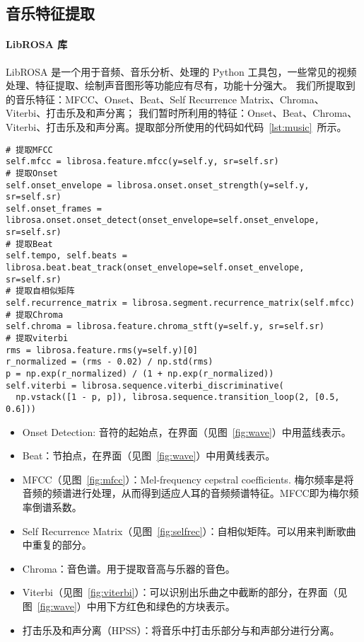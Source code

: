 \documentclass[a4paper,utf8,10pt]{article}
\newcommand{\sept}{\setlength\itemsep{-4pt}}
\begin{document}
\subsection{音乐特征提取}
\paragraph{LibROSA 库} LibROSA 是一个用于音频、音乐分析、处理的 Python 工具包，一些常见的视频处理、特征提取、绘制声音图形等功能应有尽有，功能十分强大。
我们所提取到的音乐特征：MFCC、Onset、Beat、Self Recurrence Matrix、Chroma、Viterbi、打击乐及和声分离；
我们暂时所利用的特征：Onset、Beat、Chroma、Viterbi、打击乐及和声分离。提取部分所使用的代码如代码~\ref{lst:music}~所示。
 \label{lst:music}
\begin{verbatim}
# 提取MFCC
self.mfcc = librosa.feature.mfcc(y=self.y, sr=self.sr)
# 提取Onset
self.onset_envelope = librosa.onset.onset_strength(y=self.y, sr=self.sr)
self.onset_frames = librosa.onset.onset_detect(onset_envelope=self.onset_envelope, sr=self.sr)
# 提取Beat
self.tempo, self.beats = librosa.beat.beat_track(onset_envelope=self.onset_envelope, sr=self.sr)
# 提取自相似矩阵
self.recurrence_matrix = librosa.segment.recurrence_matrix(self.mfcc)
# 提取Chroma
self.chroma = librosa.feature.chroma_stft(y=self.y, sr=self.sr)
# 提取viterbi
rms = librosa.feature.rms(y=self.y)[0]
r_normalized = (rms - 0.02) / np.std(rms)
p = np.exp(r_normalized) / (1 + np.exp(r_normalized))
self.viterbi = librosa.sequence.viterbi_discriminative(
  np.vstack([1 - p, p]), librosa.sequence.transition_loop(2, [0.5, 0.6]))
\end{verbatim}

\begin{itemize}
  \sept
  \item Onset Detection: 音符的起始点，在界面（见图~\ref{fig:wave}）中用蓝线表示。
  \item Beat：节拍点，在界面（见图~\ref{fig:wave}）中用黄线表示。
  \item MFCC（见图~\ref{fig:mfcc}）：Mel-frequency cepstral coefficients. 梅尔频率是将音频的频谱进行处理，从而得到适应人耳的音频频谱特征。MFCC即为梅尔频率倒谱系数。
  \item Self Recurrence Matrix（见图~\ref{fig:selfrec}）：自相似矩阵。可以用来判断歌曲中重复的部分。
  \item Chroma：音色谱。用于提取音高与乐器的音色。
  \item Viterbi（见图~\ref{fig:viterbi}）：可以识别出乐曲之中截断的部分，在界面（见图~\ref{fig:wave}）中用下方红色和绿色的方块表示。
  \item 打击乐及和声分离（HPSS）：将音乐中打击乐部分与和声部分进行分离。
\end{itemize}
\end{document}
